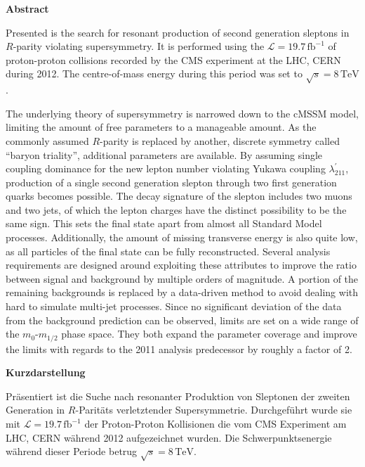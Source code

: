 \documentclass[11pt,a4paper,twoside,openright,DIV=13,BCOR=1cm]{scrbook} %
\numberwithin{equation}{chapter} %
\numberwithin{figure}{chapter} %
\numberwithin{table}{chapter} %
\begin{document}

\newpage
\begin{center} \textbf{Abstract} \end{center}
\noindent Presented is the search for resonant production of second generation sleptons in $R$-parity violating supersymmetry. It is performed using the $\mathcal{L} = 19.7\,\text{fb}^{-1}$ of proton-proton collisions recorded by the CMS experiment at the LHC, CERN during 2012. The centre-of-mass energy during this period was set to $\sqrt{s} = 8\,\text{TeV}$.

The underlying theory of supersymmetry is narrowed down to the cMSSM model, limiting the amount of free parameters to a manageable amount. As the commonly assumed $R$-parity is replaced by another, discrete symmetry called ``baryon triality'', additional parameters are available. By assuming single coupling dominance for the new lepton number violating Yukawa coupling $\lambda^\prime_{211}$, production of a single second generation slepton through two first generation quarks becomes possible. The decay signature of the slepton includes two muons and two jets, of which the lepton charges have the distinct possibility to be the same sign. This sets the final state apart from almost all Standard Model processes. Additionally, the amount of missing transverse energy is also quite low, as all particles of the final state can be fully reconstructed. Several analysis requirements are designed around exploiting these attributes to improve the ratio between signal and background by multiple orders of magnitude. A portion of the remaining backgrounds is replaced by a data-driven method to avoid dealing with hard to simulate multi-jet processes. Since no significant deviation of the data from the background prediction can be observed, limits are set on a wide range of the $m_0$-$m_{1/2}$ phase space. They both expand the parameter coverage and improve the limits with regards to the 2011 analysis predecessor by roughly a factor of 2.


\newpage
\begin{center} \textbf{Kurzdarstellung} \end{center}
\noindent Präsentiert ist die Suche nach resonanter Produktion von Sleptonen der zweiten Generation in $R$-Paritäts verletztender Supersymmetrie. Durchgeführt wurde sie mit $\mathcal{L} = 19.7\,\text{fb}^{-1}$ der Proton-Proton Kollisionen die vom CMS Experiment am LHC, CERN während 2012 aufgezeichnet wurden. Die Schwerpunktsenergie während dieser Periode betrug $\sqrt{s} = 8\,\text{TeV}$.
\end{document}
